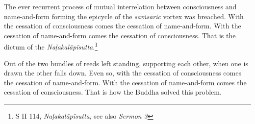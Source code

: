 The ever recurrent process of mutual interrelation between consciousness and name-and-form forming the epicycle of the \emph{saṁsāric} vortex was breached. With the cessation of consciousness comes the cessation of name-and-form. With the cessation of name-and-form comes the cessation of consciousness. That is the dictum of the \emph{Naḷakalāpīsutta}.\footnote{S II 114, \emph{Naḷakalāpīsutta}, see also \emph{Sermon 3}}

Out of the two bundles of reeds left standing, supporting each other, when one is drawn the other falls down. Even so, with the cessation of consciousness comes the cessation of name-and-form. With the cessation of name-and-form comes the cessation of consciousness. That is how the Buddha solved this problem.
